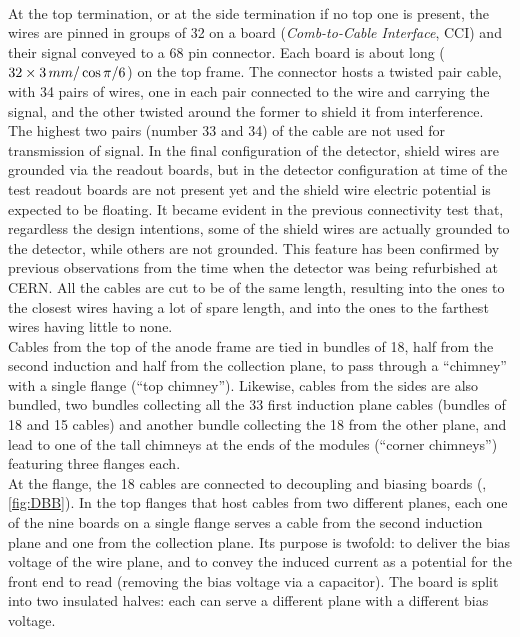 \\
At the top termination, or at the side termination if no top one is present,
the wires are pinned in groups of 32 on a board (\emph{Comb-to-Cable Interface},
CCI) and their signal conveyed to a 68 pin connector.
Each board is about  long ($32 \times 3\,mm / \cos \pi/6$) on the top
frame.
The connector hosts a twisted pair cable, with 34 pairs of wires, one in each pair
connected to the wire and carrying the signal, and the other twisted around the
former to shield it from interference. The highest two pairs (number 33 and 34)
of the cable are not used for transmission of signal.
In the final configuration of the detector, shield wires are grounded via the
readout boards, but in the detector configuration at time of the test readout
boards are not present yet and the shield wire electric potential is expected to
be floating.
It became evident in the previous connectivity test that, regardless the design
intentions, some of the shield wires are actually grounded to the detector,
while others are not grounded. This feature has been confirmed by previous
observations from the time when the detector was being refurbished at CERN.
All the cables are cut to be of the same length, resulting into the ones to the
closest wires having a lot of spare length, and into the ones to the farthest
wires having little to none.\\
Cables from the top of the anode frame are tied in bundles of 18, half from the
second induction and half from the collection plane, to pass through a
``chimney'' with a single flange (``top chimney'').
Likewise, cables from the sides are also bundled, two bundles collecting all the
33 first induction plane cables (bundles of 18 and 15 cables) and another bundle
collecting the 18 from the other plane, and lead to one of the tall chimneys at
the ends of the modules (``corner chimneys'') featuring three flanges each.\\
At the flange, the 18 cables are connected to decoupling and biasing
boards\cite{ICARUSDBB} (\DBB, \cref{fig:DBB}).
In the top flanges that host cables from two different planes, each one of the
nine boards on a single flange serves a cable from the second induction plane
and one from the collection plane.
Its purpose is twofold: to deliver the bias voltage of the wire plane, and
to convey the induced current as a potential for the front end to read
(removing the bias voltage via a  capacitor).
The board is split into two insulated halves: each can serve a
different plane with a different bias voltage.

